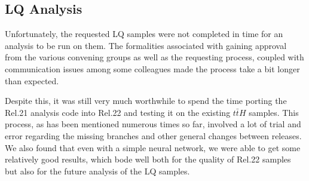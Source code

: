 \subsection{LQ Analysis}
    Unfortunately, the requested LQ samples were not completed in time for an analysis to be run on them. The formalities associated with gaining approval from the various convening groups as well as the requesting process, coupled with communication issues among some colleagues made the process take a bit longer than expected.

    Despite this, it was still very much worthwhile to spend the time porting the Rel.21 analysis code into Rel.22 and testing it on the existing $t\bar{t}H$ samples. This process, as has been mentioned numerous times so far, involved a lot of trial and error regarding the missing branches and other general changes between releases. We also found that even with a simple neural network, we were able to get some relatively good results, which bode well both for the quality of Rel.22 samples but also for the future analysis of the LQ samples.